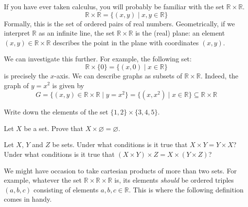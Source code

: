 \begin{example}
If you have ever taken calculus, you will probably be familiar with the set $\mathbb{R} \times \mathbb{R}$.
\[ \mathbb{R} \times \mathbb{R} = \{ (x,y) \mid x,y \in \mathbb{R} \} \]
Formally, this is the set of ordered pairs of real numbers. Geometrically, if we interpret $\mathbb{R}$ as an infinite line, the set $\mathbb{R} \times \mathbb{R}$ is the (real) plane: an element $(x,y) \in \mathbb{R} \times \mathbb{R}$ describes the point in the plane with coordinates $(x,y)$.

We can investigate this further. For example, the following set:
\[ \mathbb{R} \times \{ 0 \} = \{ (x,0) \mid x \in \mathbb{R} \} \]
is precisely the $x$-axis. We can describe graphs as subsets of $\mathbb{R} \times \mathbb{R}$. Indeed, the graph of $y=x^2$ is given by
\[ G = \{ (x,y) \in \mathbb{R} \times \mathbb{R} \mid y = x^2 \} = \{ (x,x^2) \mid x \in \mathbb{R} \} \subseteq \mathbb{R} \times \mathbb{R} \]
\end{example}

\begin{exercise}
Write down the elements of the set $\{ 1, 2 \} \times \{ 3, 4, 5 \}$.
\end{exercise}

\begin{exercise}
Let $X$ be a set. Prove that $X \times \varnothing = \varnothing$.
\end{exercise}

\begin{exercise}
\label{exCartesianProductNotAssociative}
Let $X$, $Y$ and $Z$ be sets. Under what conditions is it true that $X \times Y = Y \times X$? Under what conditions is it true that $(X \times Y) \times Z = X \times (Y \times Z)$?
\end{exercise}

We might have occasion to take cartesian products of more than two sets. For example, whatever the set $\mathbb{R} \times \mathbb{R} \times \mathbb{R}$ is, its elements \textit{should} be ordered triples $(a,b,c)$ consisting of elements $a,b,c \in \mathbb{R}$. This is where the following definition comes in handy.


